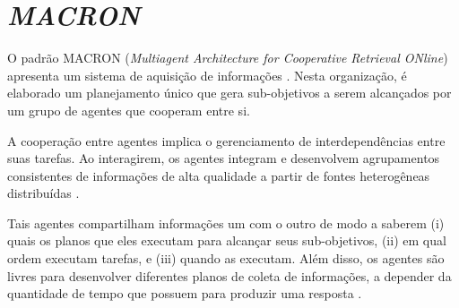 \chapter{\textit{MACRON}}\label{subsec:macron}



O padrão MACRON (\textit{Multiagent Architecture for Cooperative Retrieval ONline}) apresenta um sistema de aquisição de informações \cite{decker1995macron}. Nesta organização, é elaborado um planejamento único que gera sub-objetivos a serem  alcançados por um grupo de agentes que cooperam entre si.

A cooperação entre agentes implica o gerenciamento de interdependências entre suas tarefas. Ao interagirem, os agentes integram e desenvolvem agrupamentos consistentes de informações de alta qualidade a partir de fontes heterogêneas distribuídas \cite{decker1995macron}.  

Tais agentes compartilham informações um com o outro de modo a saberem (i) quais os planos que eles executam para alcançar seus sub-objetivos, (ii) em qual ordem executam tarefas, e (iii) quando as executam. Além disso, os agentes são livres para desenvolver diferentes planos de coleta de informações, a depender da quantidade de tempo que possuem para produzir uma resposta \cite{decker1995macron}. 


